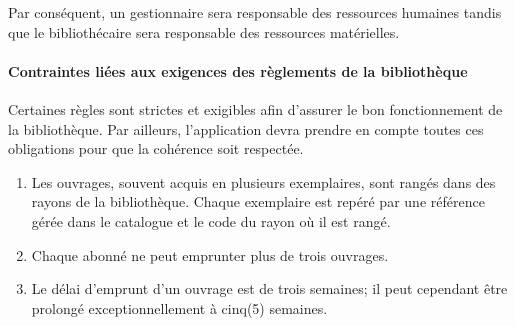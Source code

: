 Par conséquent, un gestionnaire sera responsable des ressources humaines tandis que
le bibliothécaire sera responsable des ressources matérielles.
    
\paragraph{Contraintes liées aux exigences des règlements de la bibliothèque}
Certaines règles sont strictes et exigibles afin d’assurer le bon fonctionnement 
de la bibliothèque. Par ailleurs, l’application devra prendre en compte toutes
 ces obligations pour que la cohérence soit respectée. \par
 \begin{enumerate}
     \item Les ouvrages, souvent acquis en plusieurs exemplaires, sont 
     rangés dans des rayons de la bibliothèque. Chaque exemplaire est repéré 
     par une référence gérée dans le catalogue et le code du rayon où il est rangé.
     \item Chaque abonné ne peut emprunter plus de trois ouvrages.
     \item Le délai d’emprunt d’un ouvrage est de trois semaines; il peut 
     cependant être prolongé exceptionnellement à cinq(5) semaines.
 \end{enumerate}